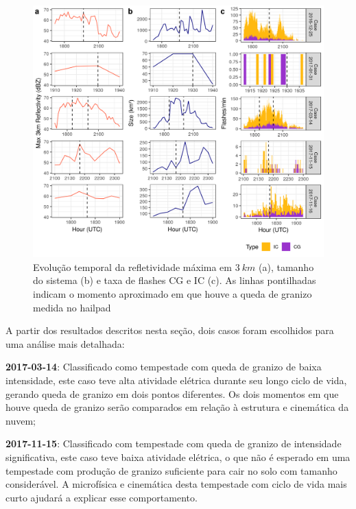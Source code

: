 \begin{figure}[hbt]
	\begin{center}
		\caption{Evolução temporal da refletividade máxima em $3\:km$ (a), tamanho do sistema (b) e taxa de flashes CG e IC (c). As linhas pontilhadas indicam o momento aproximado em que houve a queda de granizo medida no hailpad} 
		\label{painel_ciclo}
		\includegraphics[width=\columnwidth]{../General_Processing/figures/cases_dbz_size_lightning.png}
	\end{center}
\end{figure}



A partir dos resultados descritos nesta seção, dois casos foram escolhidos para uma análise mais detalhada:

\begin{alineas}
	\item \textbf{2017-03-14}: Classificado como tempestade com queda de granizo de baixa intensidade, este caso teve alta atividade elétrica durante seu longo ciclo de vida, gerando queda de granizo em dois pontos diferentes. Os dois momentos em que houve queda de granizo serão comparados em relação à estrutura e cinemática da nuvem;
	\item \textbf{2017-11-15}: Classificado com tempestade com queda de granizo de intensidade significativa, este caso teve baixa atividade elétrica, o que não é esperado em uma tempestade com produção de granizo suficiente para cair no solo com tamanho considerável. A microfísica e cinemática desta tempestade com ciclo de vida mais curto ajudará a explicar esse comportamento.
\end{alineas}

